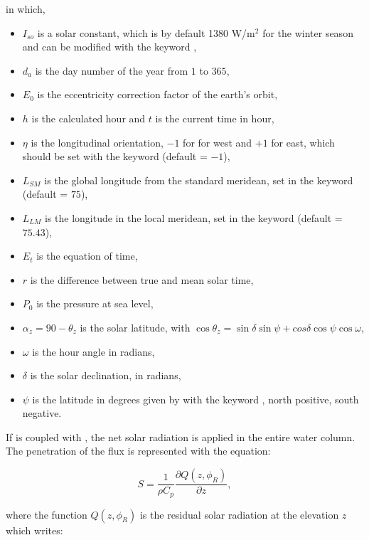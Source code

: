 in which,
\begin{itemize}
   \item $I_{so}$ is a solar constant, which is by default 1380 W/m$^2$ for the winter season and can be modified with the keyword ,
   \item $d_a$ is the day number of the year from $1$ to $365$,
   \item $E_0$ is the eccentricity correction factor of the earth’s orbit,
   \item $h$ is the calculated hour and $t$ is the current time in hour,
   \item $\eta$ is the longitudinal orientation, $-1$ for for west and $+1$ for east, which should be set with the keyword  (default = $-1$),
   \item $L_{SM}$ is the global longitude from the standard meridean, set in the keyword  (default = $75$),
   \item $L_{LM}$ is the longitude in the local meridean, set in the keyword  (default = $75.43$),
   \item $E_t$ is the equation of time,
   \item $r$ is the difference between true and mean solar time,
   \item $P_0$ is the pressure at sea level,
   \item $\alpha_z=90-\theta_z$ is the solar latitude, with $\cos\theta_z=\sin\delta\sin\psi+cos\delta\cos\psi\cos\omega$,
   \item $\omega$ is the hour angle in radians,
   \item $\delta$ is the solar declination, in radians,
   \item $\psi$ is the latitude in degrees given by \telemac with the keyword , north positive, south negative.
\end{itemize}

If \khione{} is coupled with , the net solar radiation is applied in the entire water column. The penetration of the flux is represented with the equation:

\begin{equation}
S=\dfrac{1}{\rho C_p}\dfrac{\partial Q(z,\phi_R)}{\partial z},
\end{equation}

where the function $Q(z, \phi_R)$ is the residual solar radiation at the elevation $z$ which writes:

